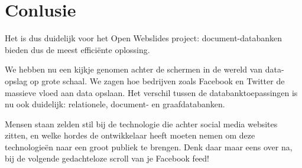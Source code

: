 \documentclass[twoside,twocolumn]{article}
\begin{document}

\section*{Conlusie}

Het is dus duidelijk voor het Open Webslides project: document-databanken bieden dus de meest effici\"{e}nte oplossing.

We hebben nu een kijkje genomen achter de schermen in de wereld van data-opslag op grote schaal.
We zagen hoe bedrijven zoals Facebook en Twitter de massieve vloed aan data opslaan.
Het verschil tussen de databanktoepassingen is nu ook duidelijk: relationele, document- en graafdatabanken.

Mensen staan zelden stil bij de technologie die achter social media websites zitten, en welke hordes de ontwikkelaar heeft moeten nemen om deze technologie\"{e}n naar een groot publiek te brengen.
Denk daar maar eens over na, bij de volgende gedachteloze scroll van je Facebook feed!
\end{document}
